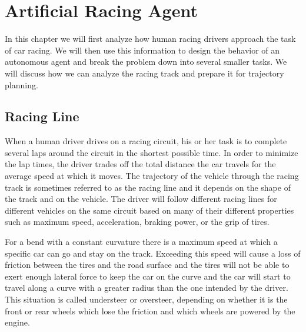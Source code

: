 \chapter{Artificial Racing Agent}
\label{chapter:agent}

In this chapter we will first analyze how human racing drivers approach the task of car racing. We will then use this information to design the behavior of an autonomous agent and break the problem down into several smaller tasks. We will discuss how we can analyze the racing track and prepare it for trajectory planning.

\section{Racing Line}
\label{sec:racing_line}

When a human driver drives on a racing circuit, his or her task is to complete several laps around the circuit in the shortest possible time. In order to minimize the lap times, the driver trades off the total distance the car travels for the average speed at which it moves. The trajectory of the vehicle through the racing track is sometimes referred to as the racing line and it depends on the shape of the track and on the vehicle. The driver will follow different racing lines for different vehicles on the same circuit based on many of their different properties such as maximum speed, acceleration, braking power, or the grip of tires.

For a bend with a constant curvature there is a maximum speed at which a specific car can go and stay on the track. Exceeding this speed will cause a loss of friction between the tires and the road surface and the tires will not be able to exert enough lateral force to keep the car on the curve and the car will start to travel along a curve with a greater radius than the one intended by the driver. This situation is called understeer or oversteer, depending on whether it is the front or rear wheels which lose the friction and which wheels are powered by the engine.

